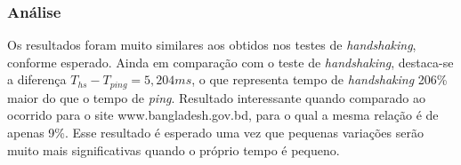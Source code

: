 \documentclass[12pt,a4paper]{report}
\begin{document}
\subsubsection*{Análise}

Os resultados foram muito similares aos obtidos nos testes de \textit{handshaking}, conforme esperado. Ainda em comparação com o teste de \textit{handshaking}, destaca-se a diferença \(T_{hs} - T_{ping} = 5,204 ms\), o que representa tempo de \textit{handshaking} 206\% maior do que o tempo de \textit{ping}. Resultado interessante quando comparado ao ocorrido para o site www.bangladesh.gov.bd, para o qual a mesma relação é de apenas 9\%. Esse resultado é esperado uma vez que pequenas variações serão muito mais significativas quando o próprio tempo é pequeno.

\end{document}
